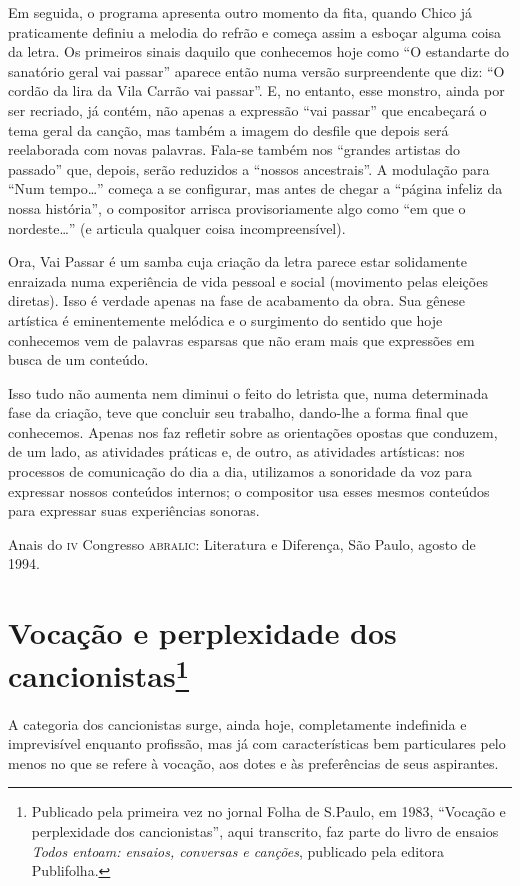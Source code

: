 Em seguida, o programa apresenta outro momento da fita, quando Chico já
praticamente definiu a melodia do refrão e começa assim a esboçar alguma
coisa da letra. Os primeiros sinais daquilo que conhecemos hoje como ``O
estandarte do sanatório geral vai passar'' aparece então numa versão
surpreendente que diz: ``O cordão da lira da Vila Carrão vai passar''.
E, no entanto, esse monstro, ainda por ser recriado, já contém, não
apenas a expressão ``vai passar'' que encabeçará o tema geral da canção,
mas também a imagem do desfile que depois será reelaborada com novas
palavras. Fala-se também nos ``grandes artistas do passado'' que,
depois, serão reduzidos a ``nossos ancestrais''. A modulação para ``Num
tempo\ldots'' começa a se configurar, mas antes de chegar a ``página
infeliz da nossa história'', o compositor arrisca provisoriamente algo
como ``em que o nordeste\ldots'' (e articula qualquer coisa
incompreensível).

Ora, Vai Passar é um samba cuja criação da letra parece estar
solidamente enraizada numa experiência de vida pessoal e social
(movimento pelas eleições diretas). Isso é verdade apenas na fase de
acabamento da obra. Sua gênese artística é eminentemente melódica e o
surgimento do sentido que hoje conhecemos vem de palavras esparsas que
não eram mais que expressões em busca de um conteúdo.

Isso tudo não aumenta nem diminui o feito do letrista que, numa determinada fase da criação, teve que concluir seu trabalho, dando-lhe a
forma final que conhecemos. Apenas nos faz refletir sobre as orientações
opostas que conduzem, de um lado, as atividades práticas e, de outro, as
atividades artísticas: nos processos de comunicação do dia a dia,
utilizamos a sonoridade da voz para expressar nossos conteúdos internos;
o compositor usa esses mesmos conteúdos para expressar suas experiências
sonoras.

Anais do \textsc{iv} Congresso \textsc{abralic}: Literatura e Diferença, São Paulo, agosto
de 1994.

\chapter{Vocação e perplexidade dos cancionistas\footnote{Publicado pela primeira vez no jornal Folha de S.Paulo, em 1983, ``Vocação e perplexidade dos
cancionistas'', aqui transcrito, faz parte do livro de ensaios \textit{Todos entoam: ensaios, conversas e canções}, publicado pela editora Publifolha.}}


A categoria dos cancionistas surge, ainda hoje, completamente indefinida
e imprevisível enquanto profissão, mas já com características bem
particulares pelo menos no que se refere à vocação, aos dotes e às
preferências de seus aspirantes.

